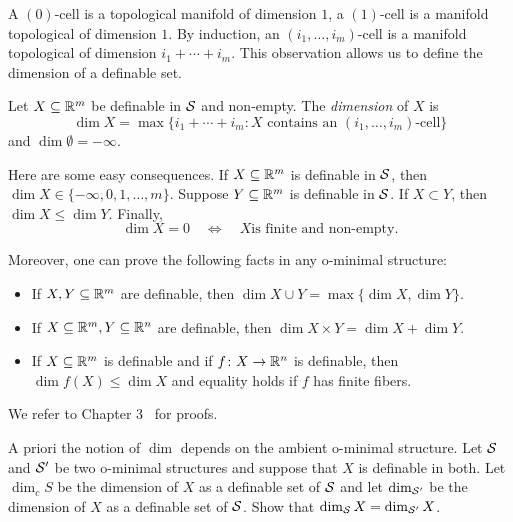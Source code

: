 A $(0)$-cell is a topological manifold of dimension $1$, a $(1)$-cell
is a manifold topological of dimension $1$. By induction, an
$(i_1,\ldots,i_m)$-cell is a manifold topological  of dimension
$i_1+\cdots+i_m$. This observation allows us to define the dimension
of a definable set.
 
\begin{definition}
  Let $X\subseteq{\mathbb{R}}^m$ be definable in ${\mathcal S}$ and non-empty. The
  \emph{dimension} of $X$ is
  \begin{equation*}
    \dim X = \max \{i_1+\cdots+i_m: X\text{ contains an
    }(i_1,\ldots,i_m)\text{-cell}\}
  \end{equation*}
  and $\dim \emptyset=-\infty$. 
\end{definition}

\begin{remark}
  Here are some easy consequences. If $X\subseteq{\mathbb{R}}^m$ is definable in
  ${\mathcal S}$, then $\dim X \in\{-\infty,0,1,\ldots,m\}$.
  Suppose $Y\subseteq{\mathbb{R}}^m$ is definable in ${\mathcal S}$. If $X\subset Y$, then
  $\dim X\le \dim Y$. 
  Finally,
  \begin{equation*}
    \dim X = 0 \quad\Longleftrightarrow\quad \text{$X$
      is finite and non-empty.}
  \end{equation*}

  Moreover, one can prove the following facts in any o-minimal structure:
  \begin{itemize}  
  \item If $X,Y\subseteq{\mathbb{R}}^m$ are definable, then  $\dim X\cup Y = \max\{\dim X,\dim Y\}$.
  \item If $X\subseteq{\mathbb{R}}^m,Y\subseteq{\mathbb{R}}^n$ are definable, then  $\dim
    X\times Y = \dim X +\dim Y$.
  \item If $X\subseteq{\mathbb{R}}^m$ is definable and if $f\colon
    X\rightarrow{\mathbb{R}}^n$ is definable, then $\dim f(X) \le \dim X$ and
    equality holds if $f$ has finite fibers.
  \end{itemize}

  We refer to Chapter 3~\cite{D:oMin} for proofs. 
\end{remark}

\begin{exercise}
  A priori the notion of $\dim$ depends on the ambient o-minimal
  structure. Let ${\mathcal S}$ and ${\mathcal S}'$ be two o-minimal structures and
  suppose that $X$ is definable in both.
  Let $\dim_cS$ be the dimension of $X$ as a definable set of ${\mathcal S}$
  and let $\dim_{{\mathcal S}'}$ be the dimension of $X$ as a definable set of ${\mathcal S}$.
  Show that $\dim_{{\mathcal S}} X =
  \dim_{{\mathcal S}'} X$.
\end{exercise}

